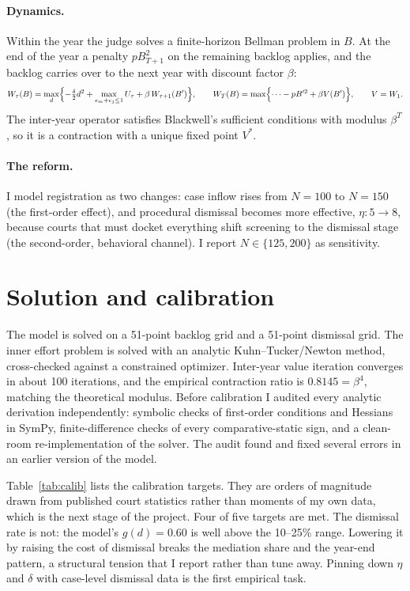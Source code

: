 \documentclass[11pt,letterpaper]{article}
\begin{document}
\paragraph{Dynamics.} Within the year the judge solves a finite-horizon Bellman problem in $B$. At the end of the year a penalty $pB_{T+1}^2$ on the remaining backlog applies, and the backlog carries over to the next year with discount factor $\beta$:
\begin{equation}
W_\tau(B)=\max_{d}\Bigl\{-\tfrac{\delta}{2}d^2+\max_{e_m+e_j\le 1}U_\tau+\beta\,W_{\tau+1}(B')\Bigr\},\qquad
W_T(B)=\max\Bigl\{\cdots-pB'^2+\beta V(B')\Bigr\},\qquad V=W_1 .
\end{equation}
The inter-year operator satisfies Blackwell's sufficient conditions with modulus $\beta^T$, so it is a contraction with a unique fixed point $V^*$.

\paragraph{The reform.} I model registration as two changes: case inflow rises from $N=100$ to $N=150$ (the first-order effect), and procedural dismissal becomes more effective, $\eta: 5\to 8$, because courts that must docket everything shift screening to the dismissal stage (the second-order, behavioral channel). I report $N\in\{125,200\}$ as sensitivity.

\section{Solution and calibration}

The model is solved on a 51-point backlog grid and a 51-point dismissal grid. The inner effort problem is solved with an analytic Kuhn--Tucker/Newton method, cross-checked against a constrained optimizer. Inter-year value iteration converges in about 100 iterations, and the empirical contraction ratio is $0.8145=\beta^4$, matching the theoretical modulus. Before calibration I audited every analytic derivation independently: symbolic checks of first-order conditions and Hessians in SymPy, finite-difference checks of every comparative-static sign, and a clean-room re-implementation of the solver. The audit found and fixed several errors in an earlier version of the model.

Table~\ref{tab:calib} lists the calibration targets. They are orders of magnitude drawn from published court statistics rather than moments of my own data, which is the next stage of the project. Four of five targets are met. The dismissal rate is not: the model's $g(d)=0.60$ is well above the 10--25\% range. Lowering it by raising the cost of dismissal breaks the mediation share and the year-end pattern, a structural tension that I report rather than tune away. Pinning down $\eta$ and $\delta$ with case-level dismissal data is the first empirical task.
\end{document}
